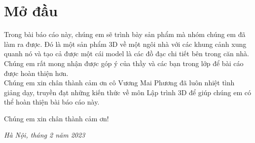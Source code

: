 \section*{Mở đầu}
Trong bài báo cáo này, chúng em sẽ trình bày sản phẩm mà nhóm chúng em đã làm ra được. Đó là một sản phẩm 3D về một ngôi nhà với các khung cảnh xung quanh nó và tạo cả được một cái model là các đồ đạc chi tiết bên trong căn nhà. Chúng em rất mong nhận được góp ý của thầy và các bạn trong lớp để bài cáo được hoàn thiện hơn.\\

\indent Chúng em xin chân thành cảm ơn cô Vương Mai Phương đã luôn nhiệt tình giảng dạy, truyền đạt những kiến thức về môn Lập trình 3D để giúp chúng em có thể hoàn thiện bài báo cáo này.

\indent Chúng em xin chân thành cảm ơn!

\begin{minipage}{0.5\textwidth}
\end{minipage}
\hspace{0.5\textwidth}
\begin{minipage}{0.5\textwidth}
	\noindent\begin{center}
		\vspace{0.5cm}
		\textit{Hà Nội, tháng 2 năm 2023}
		\textbf{}
	\end{center}	
\end{minipage}

\newpage
\renewcommand{\arraystretch}{2}




